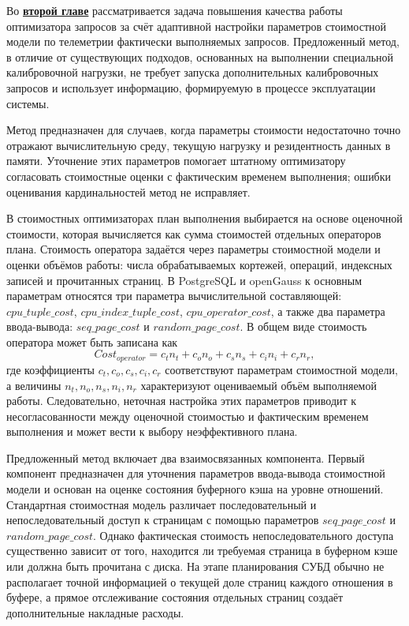 Во \underline{\textbf{второй главе}} рассматривается задача повышения качества работы оптимизатора запросов за счёт адаптивной настройки параметров стоимостной модели по телеметрии фактически выполняемых запросов. Предложенный метод, в отличие от существующих подходов, основанных на выполнении специальной калибровочной нагрузки, не требует запуска дополнительных калибровочных запросов и использует информацию, формируемую в процессе эксплуатации системы.

Метод предназначен для случаев, когда параметры стоимости недостаточно точно отражают вычислительную среду, текущую нагрузку и резидентность данных в памяти. Уточнение этих параметров помогает штатному оптимизатору согласовать стоимостные оценки с фактическим временем выполнения; ошибки оценивания кардинальностей метод не исправляет.


В стоимостных оптимизаторах план выполнения выбирается на основе оценочной стоимости, которая вычисляется как сумма стоимостей отдельных операторов плана. Стоимость оператора задаётся через параметры стоимостной модели и оценки объёмов работы: числа обрабатываемых кортежей, операций, индексных записей и прочитанных страниц. В PostgreSQL и openGauss к основным параметрам относятся три параметра вычислительной составляющей: \(cpu\_tuple\_cost\), \(cpu\_index\_tuple\_cost\), \(cpu\_operator\_cost\), а также два параметра ввода-вывода: \(seq\_page\_cost\) и \(random\_page\_cost\). В общем виде стоимость оператора может быть записана как
\[
Cost_{operator}=c_t n_t+c_o n_o+c_s n_s+c_i n_i+c_r n_r,
\]
где коэффициенты \(c_t, c_o, c_s, c_i, c_r\) соответствуют параметрам стоимостной модели, а величины \(n_t, n_o, n_s, n_i, n_r\) характеризуют оцениваемый объём выполняемой работы. Следовательно, неточная настройка этих параметров приводит к несогласованности между оценочной стоимостью и фактическим временем выполнения и может вести к выбору неэффективного плана.

Предложенный метод включает два взаимосвязанных компонента. Первый компонент предназначен для уточнения параметров ввода-вывода стоимостной модели и основан на оценке состояния буферного кэша на уровне отношений. Стандартная стоимостная модель различает последовательный и непоследовательный доступ к страницам с помощью параметров \(seq\_page\_cost\) и \(random\_page\_cost\). Однако фактическая стоимость непоследовательного доступа существенно зависит от того, находится ли требуемая страница в буферном кэше или должна быть прочитана с диска. На этапе планирования СУБД обычно не располагает точной информацией о текущей доле страниц каждого отношения в буфере, а прямое отслеживание состояния отдельных страниц создаёт дополнительные накладные расходы.

